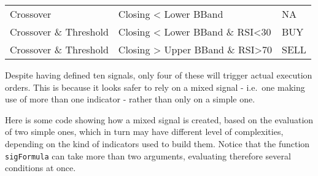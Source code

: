 \documentclass[
  11pt,
]{article}
\begin{document}
\begin{longtable}[]{@{}lll@{}}
\begin{minipage}[t]{0.30\columnwidth}
Crossover\strut
\end{minipage} & \begin{minipage}[t]{0.42\columnwidth}\raggedright
Closing \textless{} Lower BBand\strut
\end{minipage} & \begin{minipage}[t]{0.15\columnwidth}\raggedright
NA\strut
\end{minipage}\tabularnewline
\begin{minipage}[t]{0.30\columnwidth}\raggedright
Crossover \& Threshold\strut
\end{minipage} & \begin{minipage}[t]{0.42\columnwidth}\raggedright
Closing \textless{} Lower BBand \& RSI\textless30\strut
\end{minipage} & \begin{minipage}[t]{0.15\columnwidth}\raggedright
BUY\strut
\end{minipage}\tabularnewline
\begin{minipage}[t]{0.30\columnwidth}\raggedright
Crossover \& Threshold\strut
\end{minipage} & \begin{minipage}[t]{0.42\columnwidth}\raggedright
Closing \textgreater{} Upper BBand \& RSI\textgreater70\strut
\end{minipage} & \begin{minipage}[t]{0.15\columnwidth}\raggedright
SELL\strut
\end{minipage}\tabularnewline
\bottomrule
\end{longtable}

Despite having defined ten signals, only four of these will trigger
actual execution orders. This is because it looks safer to rely on a
mixed signal - i.e.~one making use of more than one indicator - rather
than only on a simple one.

Here is some code showing how a mixed signal is created, based on the
evaluation of two simple ones, which in turn may have different level of
complexities, depending on the kind of indicators used to build them.
Notice that the function \texttt{sigFormula} can take more than two
arguments, evaluating therefore several conditions at once.
\end{document}
